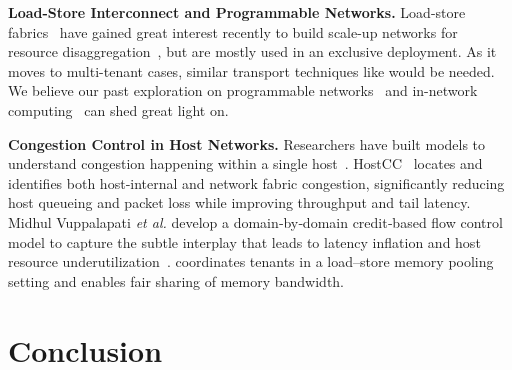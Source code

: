 \noindent
{\bf Load-Store Interconnect and Programmable Networks.} Load-store fabrics~\cite{cxl, rpcibench-nsdi24, ualink, nvlink} have gained great interest recently to build scale-up networks for resource disaggregation~\cite{gimbal-sigcomm21, dremel-sigmetrics22, leed-sigcomm23, ezns-osdi23, ezns-tos24, flint-nsdi25, ntprof-nsdi25, megastation-nsdi25, frsm-nsdi20, tapdb-asplos26}, but are mostly used in an exclusive deployment. As it moves to multi-tenant cases, similar transport techniques like \sys would be needed. We believe our past exploration on programmable networks~\cite{afq-nsdi18, calq-nsdi20, lognic-micro23, bf3charac-icnp24, rpcnic-hpca25, scr-nsdi25, sgiov-asplos26, pedal-nsdi26} and in-network computing~\cite{incbricks-asplos17, luo2017motivating, floem-osdi18, e3-atc19, ipipe-sigcomm19, liu2020building, clara-hotnets20, clara-sosp21, xenic-sosp21, ask-asplos23} can shed great light on.

\noindent
{\bf Congestion Control in Host Networks.} 
Researchers have built models to understand congestion happening within a single host~\cite{cai2021understanding, agarwal2023host, vuppalapati2024understanding, scn-hotnets25}.
HostCC~\cite{agarwal2023host} locates and identifies both host‑internal and network fabric congestion, significantly reducing host queueing and packet loss while improving throughput and tail latency.
Midhul Vuppalapati \emph{et al.} develop a domain‑by‑domain credit‑based flow control model to capture the subtle interplay that leads to latency inflation and host resource underutilization~\cite{vuppalapati2024understanding}.
\sys coordinates tenants in a load–store memory pooling setting and enables fair sharing of memory bandwidth.   


\section{Conclusion}
\label{sec:concl}


